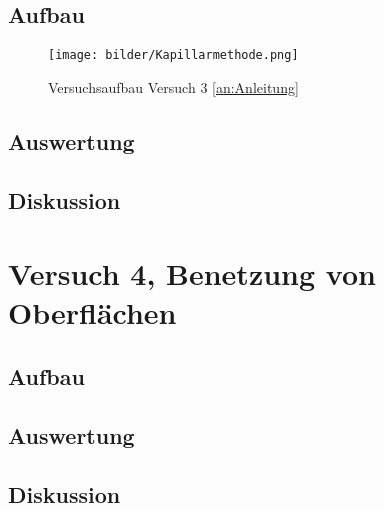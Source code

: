        \subsection{Aufbau}

       \begin{figure}[H]
           \centering
           \texttt{[image: bilder/Kapillarmethode.png]}
           \caption{Versuchsaufbau Versuch 3 \ref{an:Anleitung}}
           \label{fig:Versuch3_Aufbau}
         \end{figure}
       \subsection{Auswertung}
         \subsection{Diskussion}

         \section{Versuch 4, Benetzung von Oberflächen}

         \subsection{Aufbau}
            \subsection{Auswertung}
            \subsection{Diskussion}
